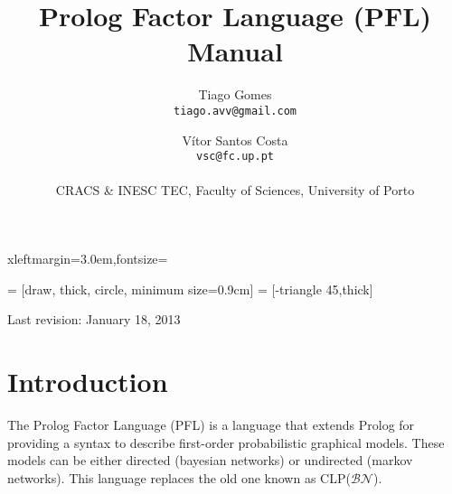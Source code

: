 \documentclass{article}
\begin{document}
 {xleftmargin=3.0em,fontsize=\small}

\newenvironment{pflcode}
  {\VerbatimEnvironment \setstretch{0.8} \begin{pflcodeve}}
  {\end{pflcodeve} }

\newcommand{\true}             {\mathtt{t}}
\newcommand{\false}            {\mathtt{f}}
\newcommand{\pathsep}          { $\triangleright$ }
\newcommand{\tableline}        {\noalign{\hrule height 0.8pt}}
\newcommand{\optionsection}[1] {\subsection*{\texttt{#1}}}

   = [draw, thick, circle, minimum size=0.9cm]
 = [-triangle 45,thick]

\setlength{\parskip}{\baselineskip}

\title{\Huge\textbf{Prolog Factor Language (PFL) Manual}}

\author{Tiago Gomes\\\texttt{tiago.avv@gmail.com} \and V\'{i}tor Santos Costa\\\texttt{vsc@fc.up.pt}\\\\
CRACS \& INESC TEC, Faculty of Sciences, University of Porto
}


\date{}

\maketitle
\thispagestyle{empty}
\vspace{5cm}
\begin{center}
  \large Last revision: January 18, 2013
\end{center}
\newpage



\section{Introduction}
The Prolog Factor Language (PFL) is a language that extends Prolog for providing a syntax to describe first-order probabilistic graphical models. These models can be either directed (bayesian networks) or undirected (markov networks). This language replaces the old one known as CLP($\mathcal{BN}$).
\end{document}
